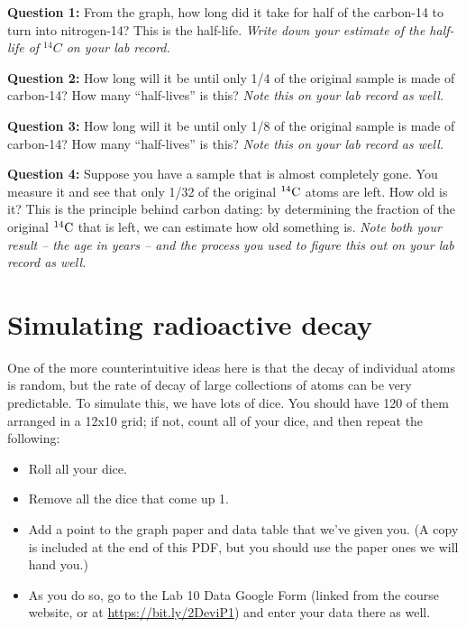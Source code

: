 \documentclass[11pt]{article}
\begin{document}
{\bf Question 1:} \rm From the graph, how long did it take for half of the carbon-14 to turn into nitrogen-14? This is the half-life. {\it Write down your estimate of the half-life of $^{14}C$ on your lab record.}

\vspace{1em}

{\bf Question 2:} How long will it be until only 1/4 of the original sample is made of carbon-14? How many ``half-lives'' is this? {\it Note this on your lab record as well.}

\vspace{1em}

{\bf Question 3:} How long will it be until only 1/8 of the original sample is made of carbon-14? How many ``half-lives'' is this? {\it Note this on your lab record as well.}

\vspace{1em}

{\bf Question 4:} Suppose you have a sample that is almost completely gone. You measure it and see that only 1/32 of the original
${}^{14}\rm C$ atoms are left. How old is it? This is the principle behind carbon dating: by determining the fraction of the original ${}^{14}\rm C$ that is left, we can estimate how old something is. {\it Note both your result -- the age in years -- and the process you used to figure this out on your lab record as well.}

\section{Simulating radioactive decay}

One of the more counterintuitive ideas here is that the decay of individual atoms is random, but the rate of decay of large collections
of atoms can be very predictable. To simulate this, we have lots of dice. You should have 120 of them arranged in a 12x10 grid; if not, count all of your dice, and then repeat the following:

\begin{itemize}
\item Roll all your dice.
\item Remove all the dice that come up 1.
\item Add a point to the graph paper and data table that we've given you. (A copy is included at the end of this PDF, but you should use the paper ones we will hand you.)
\item As you do so, go to the Lab 10 Data Google Form (linked from the course website, or at \url{https://bit.ly/2DeviP1}) and enter your data there as well.
\end{itemize}
\end{document}
